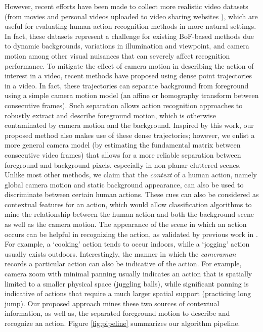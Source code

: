 However, recent efforts have been made to collect more realistic video datasets (\eg from movies and personal videos uploaded to video sharing websites  \cite{kuehne2011,  marszalek2009}), which are useful for evaluating human action recognition methods in more natural settings. In fact, these datasets represent a challenge for existing BoF-based methods due to dynamic backgrounds, variations in illumination and viewpoint, and camera motion among other visual nuisances that can severely affect recognition performance. To mitigate the effect of camera motion in describing the action of interest in a video, recent methods \cite{wang2013,wang2011} have proposed using dense point trajectories in a video. In fact, these trajectories can separate background from foreground using a simple camera motion model (\ie an affine or homography transform between consecutive frames). Such separation allows action recognition approaches to robustly extract and describe foreground motion, which is otherwise contaminated by camera motion and the background. Inspired by this work, our proposed method also makes use of these dense trajectories; however, we enlist a more general camera model (by estimating the fundamental matrix between consecutive video frames) that allows for a more reliable separation between foreground and background pixels, especially in non-planar cluttered scenes. Unlike most other methods, we claim that the \emph{context} of a human action, namely global camera motion and static background appearance, can also be used to discriminate between certain human actions. These cues can also be considered as contextual features for an action, which would allow classification algorithms to mine the relationship between the human action and both the background scene as well as the camera motion. The appearance of the scene in which an action occurs can be helpful in recognizing the action, as validated by previous work in \cite{marszalek2009}. For example, a `cooking' action tends to occur indoors, while a `jogging' action usually exists outdoors. Interestingly, the manner in which the \emph{cameraman} records a particular action can also be indicative of the action. For example, camera zoom with minimal panning usually indicates an action that is spatially limited to a smaller physical space (\eg juggling balls), while significant panning is indicative of actions that require a much larger spatial support (\eg practicing long jump). Our proposed approach mines these two sources of contextual information, as well as, the separated foreground motion to describe and recognize an action. Figure \ref{fig:pipeline} summarizes our algorithm pipeline.



